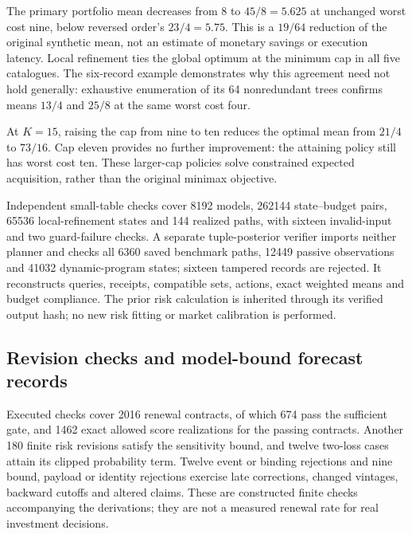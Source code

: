 \documentclass[11pt,a4paper]{article}
\theoremstyle{definition}\newtheorem{definition}[theorem]{Definition}
\begin{document}
\begin{table}[!htbp]\centering\small
\caption{Exact catalogue mean and achieved worst acquisition cost at the minimum root cap. Minimax uses the original query-index tie break; local and budget optimize a secondary mean objective. The inspection reverse policy ($\dagger$) exceeds its minimum cap three. Cost units are specified separately by each adapter.}\label{tab:budgetprimary}

\end{table}
The primary portfolio mean decreases from $8$ to $45/8=5.625$ at unchanged worst cost nine, below reversed order's $23/4=5.75$. This is a $19/64$ reduction of the original synthetic mean, not an estimate of monetary savings or execution latency. Local refinement ties the global optimum at the minimum cap in all five catalogues. The six-record example demonstrates why this agreement need not hold generally: exhaustive enumeration of its 64 nonredundant trees confirms means $13/4$ and $25/8$ at the same worst cost four.

\begin{table}[!htbp]\centering\small
\caption{Expected-cost frontier for the portfolio control $\epsilon=2$, $K=15$. The risk limit stays fixed; only the acquisition cap changes.}\label{tab:budgetfrontier}

\end{table}
At $K=15$, raising the cap from nine to ten reduces the optimal mean from $21/4$ to $73/16$. Cap eleven provides no further improvement: the attaining policy still has worst cost ten. These larger-cap policies solve constrained expected acquisition, rather than the original minimax objective.

Independent small-table checks cover 8192 models, 262144 state--budget pairs, 65536 local-refinement states and 144 realized paths, with sixteen invalid-input and two guard-failure checks. A separate tuple-posterior verifier imports neither planner and checks all 6360 saved benchmark paths, 12449 passive observations and 41032 dynamic-program states; sixteen tampered records are rejected. It reconstructs queries, receipts, compatible sets, actions, exact weighted means and budget compliance. The prior risk calculation is inherited through its verified output hash; no new risk fitting or market calibration is performed.

\subsection{Revision checks and model-bound forecast records}\label{sec:renewalresults}
Executed checks cover 2016 renewal contracts, of which 674 pass the sufficient
gate, and 1462 exact allowed score realizations for the passing contracts.
Another 180 finite risk revisions satisfy the sensitivity bound, and twelve
two-loss cases attain its clipped probability term. Twelve event or binding
rejections and nine bound, payload or identity rejections exercise late
corrections, changed vintages, backward cutoffs and altered claims. These are
constructed finite checks accompanying the derivations; they are not a measured
renewal rate for real investment decisions.
\end{document}
